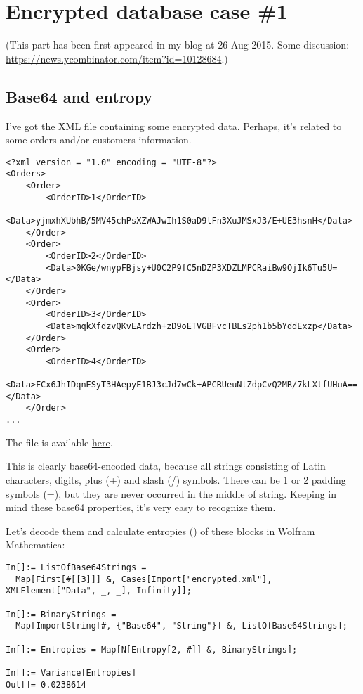 \section{Encrypted database case \#1}
\label{encrypted_DB1}

(This part has been first appeared in my blog at 26-Aug-2015.
Some discussion: \url{https://news.ycombinator.com/item?id=10128684}.)

\subsection{Base64 and entropy}

I've got the \ac{XML} file containing some encrypted data.
Perhaps, it's related to some orders and/or customers information.

\begin{lstlisting}
<?xml version = "1.0" encoding = "UTF-8"?>
<Orders>
	<Order>
		<OrderID>1</OrderID>
		<Data>yjmxhXUbhB/5MV45chPsXZWAJwIh1S0aD9lFn3XuJMSxJ3/E+UE3hsnH</Data>
	</Order>
	<Order>
		<OrderID>2</OrderID>
		<Data>0KGe/wnypFBjsy+U0C2P9fC5nDZP3XDZLMPCRaiBw9OjIk6Tu5U=</Data>
	</Order>
	<Order>
		<OrderID>3</OrderID>
		<Data>mqkXfdzvQKvEArdzh+zD9oETVGBFvcTBLs2ph1b5bYddExzp</Data>
	</Order>
	<Order>
		<OrderID>4</OrderID>
		<Data>FCx6JhIDqnESyT3HAepyE1BJ3cJd7wCk+APCRUeuNtZdpCvQ2MR/7kLXtfUHuA==</Data>
	</Order>
...
\end{lstlisting}

The file is available \href{https://raw.githubusercontent.com/dennis714/RE-for-beginners/master/examples/encrypted_DB1/encrypted.xml}{here}.

This is clearly base64-encoded data, because all strings consisting of Latin characters, digits,
plus (+) and slash (/) symbols.
There can be 1 or 2 padding symbols (=), but they are never occurred in the middle of string.
Keeping in mind these base64 properties, it's very easy to recognize them.

Let's decode them and calculate entropies () of these blocks in Wolfram Mathematica:

\begin{lstlisting}
In[]:= ListOfBase64Strings =
  Map[First[#[[3]]] &, Cases[Import["encrypted.xml"], XMLElement["Data", _, _], Infinity]];

In[]:= BinaryStrings =
  Map[ImportString[#, {"Base64", "String"}] &, ListOfBase64Strings];

In[]:= Entropies = Map[N[Entropy[2, #]] &, BinaryStrings];

In[]:= Variance[Entropies]
Out[]= 0.0238614
\end{lstlisting}

